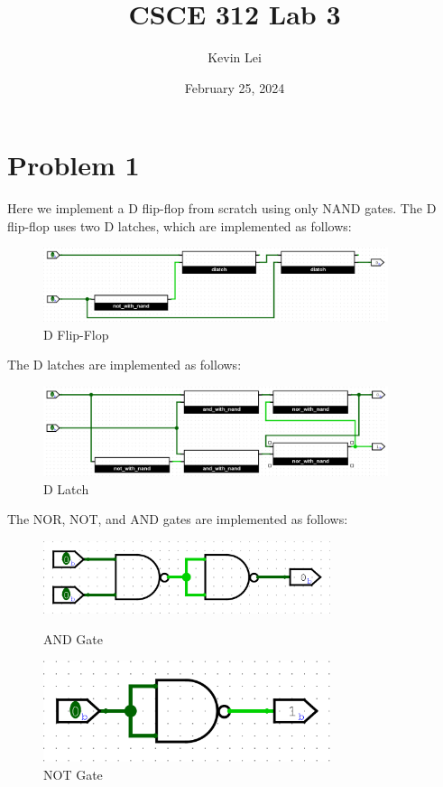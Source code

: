 \documentclass{article}
\title{CSCE 312 Lab 3}
\author{Kevin Lei}
\date{February 25, 2024}
\begin{document}
\maketitle

\section*{Problem 1}
Here we implement a D flip-flop from scratch using only NAND gates.
The D flip-flop uses two D latches, which are implemented as follows:
\begin{figure}[H]
    \centering
    \includegraphics[width=0.9\textwidth]{./images/d_flip_flop.png}
    \caption{D Flip-Flop}
\end{figure}

\noindent The D latches are implemented as follows:
\begin{figure}[H]
    \centering
    \includegraphics[width=0.9\textwidth]{./images/d_latch.png}
    \caption{D Latch}
\end{figure}

\noindent The NOR, NOT, and AND gates are implemented as follows:
\begin{figure}[H]
    \begin{minipage}{0.5\textwidth}
        \centering
        \includegraphics[width=0.75\textwidth]{./images/and_with_nand.png}
        \caption{AND Gate}
    \end{minipage}%
    \begin{minipage}{0.5\textwidth}
        \centering
        \includegraphics[width=0.75\textwidth]{./images/not_with_nand.png}
        \caption{NOT Gate}
    \end{minipage}
\end{figure}
\end{document}
